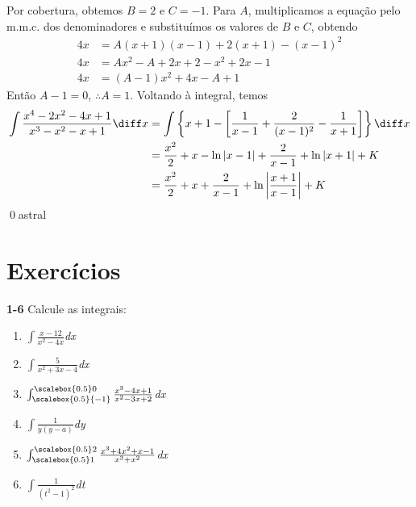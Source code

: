 \documentclass[a4paper, 12pt]{extreport}
\begin{document}
        \vspace{3mm}
        \noindent Por cobertura, obtemos $B=2$ e $C=-1$. Para $A$, multiplicamos a equação pelo m.m.c. dos denominadores e substituímos os
        valores de $B$ e $C$, obtendo
        \begin{equation*}
          \begin{split}
            4x & = A(x+1)(x-1) + 2(x+1) - (x-1)^2 \\
            4x & = Ax^2-A + 2x+2 - x^2+2x-1 \\
            4x & = (A-1)x^2 + 4x - A + 1
          \end{split}
        \end{equation*}
        Então $A-1 = 0$, $\therefore A = 1$. Voltando à integral, temos
        \begin{equation*}
          \begin{split}
            \int{\frac{x^4-2x^2-4x+1}{x^3-x^2-x+1}\diff x} & = \int{\left\{x+1-\left[\frac{1}{x-1} + \frac{2}{(x-1)^2} - \frac{1}{x+1}\right]\right\}\diff x} \\
                                                      & = \frac{x^2}{2}+x-\ln|x-1|+\frac{2}{x-1}+\ln|x+1| + K \\
                                                      & = \frac{x^2}{2}+x+\frac{2}{x-1}+\ln\left|\frac{x+1}{x-1}\right| + K
          \end{split}
        \end{equation*}
        \qed{astral}

    \section{Exercícios}
      {\color{astral}\textbf{1-6}} Calcule as integrais:
      \begin{multicols}{3}
        \begin{enumerate}
          \item \Large$\int{\frac{x-12}{x^2-4x}}$\normalsize\textit{dx}
          \item \Large$\int{\frac{5}{x^2+3x-4}}$\normalsize\textit{dx}
          \item \Large$\int_{\scalebox{0.5}{-1}}^{\scalebox{0.5}0}{\frac{x^3-4x+1}{x^2-3x+2}}$\normalsize\textit{dx}
          \item \Large$\int{\frac{1}{y(y-a)}}$\normalsize\textit{dy}
          \item \Large$\int_{\scalebox{0.5}1}^{\scalebox{0.5}2}{\frac{x^3+4x^2+x-1}{x^3+x^2}}$\normalsize\textit{dx}
          \item \Large$\int{\frac{1}{(t^2-1)^2}}$\normalsize\textit{dt}
        \end{enumerate}
      \end{multicols}
\end{document}
